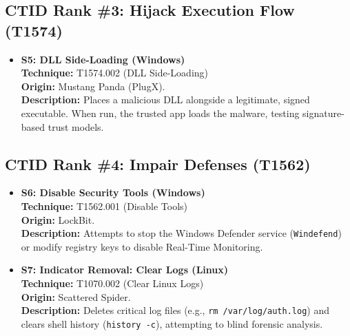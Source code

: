 \subsection{CTID Rank \#3: Hijack Execution Flow (T1574)}
\begin{itemize}
    \item \textbf{S5: DLL Side-Loading (Windows)} \\
    \textbf{Technique:} T1574.002 (DLL Side-Loading) \\
    \textbf{Origin:} Mustang Panda (PlugX). \\
    \textbf{Description:} Places a malicious DLL alongside a legitimate, signed executable. When run, the trusted app loads the malware, testing signature-based trust models.
\end{itemize}

\subsection{CTID Rank \#4: Impair Defenses (T1562)}
\begin{itemize}
    \item \textbf{S6: Disable Security Tools (Windows)} \\
    \textbf{Technique:} T1562.001 (Disable Tools) \\
    \textbf{Origin:} LockBit. \\
    \textbf{Description:} Attempts to stop the Windows Defender service (\texttt{Windefend}) or modify registry keys to disable Real-Time Monitoring.

    \item \textbf{S7: Indicator Removal: Clear Logs (Linux)} \\
    \textbf{Technique:} T1070.002 (Clear Linux Logs) \\
    \textbf{Origin:} Scattered Spider. \\
    \textbf{Description:} Deletes critical log files (e.g., \texttt{rm /var/log/auth.log}) and clears shell history (\texttt{history -c}), attempting to blind forensic analysis.
\end{itemize}

